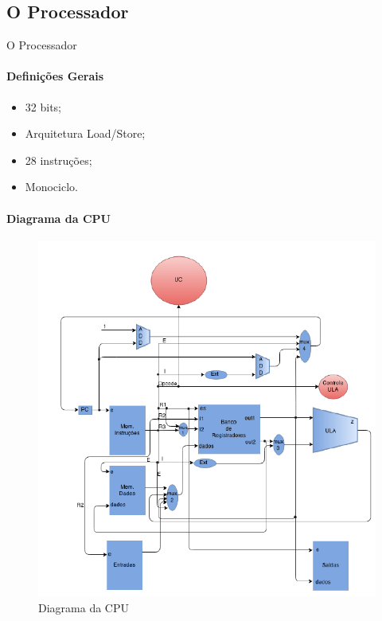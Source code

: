 \documentclass[aspectratio=169]{beamer}
\begin{document}
	\subsection{O Processador} 
	\begin{frame}{O Processador}
		\only<1>
		{
			\framesubtitle{Definições Gerais}
			\begin{itemize}
				\item 32 bits;
			
			\vspace{0.5cm}
			
				\item Arquitetura Load/Store;
				
				\vspace{0.5cm}
				
				\item 28 instruções;
				
				
				\vspace{0.5cm}
				
				\item Monociclo.
			\end{itemize}
		}
		{
			\framesubtitle{Diagrama da CPU}
			
			\begin{figure}
				\includegraphics[height=0.8\textheight]{figuras/Diagrama_da_cpu}
				\caption{Diagrama da CPU}
			\end{figure}
				
}
\end{frame}
\end{document}
